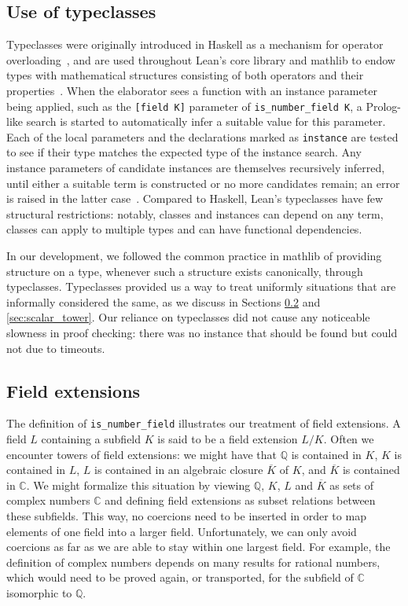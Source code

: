 \documentclass[sn-mathphys]{sn-jnl}%
\renewcommand{\C}{\mathbb{C}}
\newcommand{\lean}[1]{\texttt{#1}\xspace}
\newcommand{\mathlib}{\textsf{mathlib}\xspace}
\newcommand{\QQ}{\mathbb{Q}}
\begin{document}
\subsection{Use of typeclasses} \label{sec:typeclasses}
Typeclasses were originally introduced in Haskell as a mechanism for operator overloading~\cite{typeclasses-haskell},
and are used throughout Lean's core library and \mathlib to endow types with mathematical structures consisting of both operators and their properties~\cite{mathlib}.
When the elaborator sees a function with an instance parameter being applied, such as the \lean{[field K]} parameter of \lean{is\_number\_field K}, a Prolog-like search is started to automatically infer a suitable value for this parameter.
Each of the local parameters and the declarations marked as \lean{instance} are tested to see if their type matches the expected type of the instance search.
Any instance parameters of candidate instances are themselves recursively inferred, until either a suitable term is constructed or no more candidates remain; an error is raised in the latter case~\cite[Section 10]{theorem-proving-in-lean}.
Compared to Haskell, Lean's typeclasses have few structural restrictions: notably, classes and instances can depend on any term, classes can apply to multiple types and can have functional dependencies.

In our development, we followed the common practice in \mathlib of providing structure on a type,
whenever such a structure exists canonically, through typeclasses.
Typeclasses provided us a way to treat uniformly situations that are informally considered the same, as we discuss in Sections \ref{sec:field_extension} and \ref{sec:scalar_tower}.
Our reliance on typeclasses did not cause any noticeable slowness in proof checking:
there was no instance that should be found but could not due to timeouts.

\subsection{Field extensions} \label{sec:field_extension}

The definition of \lean{is\_number\_field} illustrates our treatment of field extensions.
A field $L$ containing a subfield $K$ is said to be a field extension $L / K$.
Often we encounter towers of field extensions: we might have that $\QQ$ is contained in $K$, $K$ is contained in $L$, $L$ is contained in an algebraic closure $\overline{K}$ of $K$, and $\overline{K}$ is contained in $\C$.
We might formalize this situation by viewing $\QQ$, $K$, $L$ and $\overline{K}$ as sets of complex numbers $\C$ and defining field extensions as subset relations between these subfields.
This way, no coercions need to be inserted in order to map elements of one field into a larger field.
Unfortunately, we can only avoid coercions as far as we are able to stay within one largest field.
For example, the definition of complex numbers depends on many results for rational numbers, which would need to be proved again, or transported, for the subfield of $\C$ isomorphic to $\QQ$.
\end{document}
